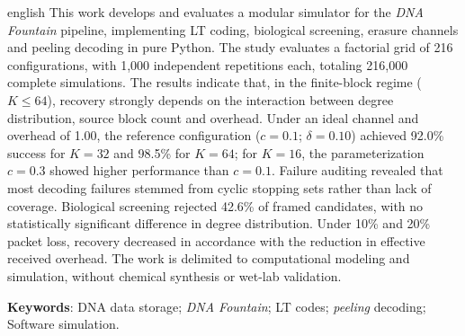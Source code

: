 \begin{resumo}[Abstract]
\begin{otherlanguage*}{english}
This work develops and evaluates a modular simulator for the \emph{DNA Fountain} pipeline, implementing LT coding, biological screening, erasure channels and peeling decoding in pure Python. The study evaluates a factorial grid of 216 configurations, with 1,000 independent repetitions each, totaling 216,000 complete simulations. The results indicate that, in the finite-block regime ($K \leq 64$), recovery strongly depends on the interaction between degree distribution, source block count and overhead. Under an ideal channel and overhead of 1.00, the reference configuration ($c=0.1$; $\delta=0.10$) achieved 92.0\% success for $K=32$ and 98.5\% for $K=64$; for $K=16$, the parameterization $c=0.3$ showed higher performance than $c=0.1$. Failure auditing revealed that most decoding failures stemmed from cyclic stopping sets rather than lack of coverage. Biological screening rejected 42.6\% of framed candidates, with no statistically significant difference in degree distribution. Under 10\% and 20\% packet loss, recovery decreased in accordance with the reduction in effective received overhead. The work is delimited to computational modeling and simulation, without chemical synthesis or wet-lab validation.

\vspace{\onelineskip}

\noindent
\textbf{Keywords}: DNA data storage; \emph{DNA Fountain}; LT codes; \emph{peeling} decoding; Software simulation.
\end{otherlanguage*}
\end{resumo}
